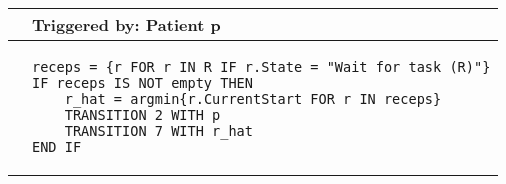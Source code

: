 \begin{tabular}{@{}>{\raggedright\arraybackslash}p{0.25cm}>{\raggedright\arraybackslash}p{13cm}@{}}
  \toprule
   & Triggered by: Patient p\\ \midrule 
  &
\vspace{-12pt}
\begin{lstlisting}[language=CMPseudo]
receps = {r FOR r IN R IF r.State = "Wait for task (R)"}
IF receps IS NOT empty THEN 
    r_hat = argmin{r.CurrentStart FOR r IN receps}
    TRANSITION 2 WITH p
    TRANSITION 7 WITH r_hat
END IF
\end{lstlisting}
  \\ \bottomrule
  \end{tabular}